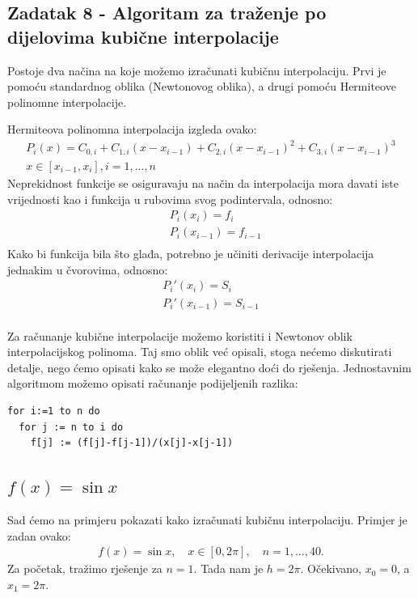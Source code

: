 \documentclass[12pt,a4paper]{report}
\begin{document}
		\subsection{Zadatak 8 - Algoritam za traženje po dijelovima kubične interpolacije}
		Postoje dva načina na koje možemo izračunati kubičnu interpolaciju. Prvi je pomoću standardnog oblika (Newtonovog oblika), a drugi pomoću Hermiteove polinomne interpolacije.
		
		Hermiteova polinomna interpolacija izgleda ovako:
		\begin{align*}
		P_i(x)=C_{0,i}+C_{1,i}(x-x_{i-1})+C_{2,i}(x-x_{i-1})^2+C_{3,i}(x-x_{i-1})^3 \\
		x\in[x_{i-1}, x_i], i=1,...,n
		\end{align*}
		Neprekidnost funkcije se osiguravaju na način da interpolacija mora davati iste vrijednosti kao i funkcija u rubovima svog podintervala, odnosno:
		\begin{align*}
			&P_i(x_i)=f_i\\
			&P_i(x_{i-1})=f_{i-1}\\
		\end{align*}
		Kako bi funkcija bila što glađa, potrebno je učiniti derivacije interpolacija jednakim u čvorovima, odnosno:
		\begin{align*}
		P_i'(x_i)=S_i\\
		P_i'(x_{i-1})=S_{i-1}\\
		\end{align*}
		
		
		Za računanje kubične interpolacije možemo koristiti i Newtonov oblik interpolacijskog polinoma. Taj smo oblik već opisali, stoga nećemo diskutirati detalje, nego ćemo opisati kako se može elegantno doći do rješenja. Jednostavnim algoritmom možemo opisati računanje podijeljenih razlika:
		\begin{lstlisting}
for i:=1 to n do
  for j := n to i do
    f[j] := (f[j]-f[j-1])/(x[j]-x[j-1])
		\end{lstlisting}


		\subsection{$f(x)=\sin x$}
		Sad ćemo na primjeru pokazati kako izračunati kubičnu interpolaciju. Primjer je zadan ovako:
		\begin{align*}
			f(x)=\sin x, \quad x\in [0, 2\pi], \quad n=1,...,40.
		\end{align*}
		Za početak, tražimo rješenje za $n=1$. Tada nam je $h=2\pi$. Očekivano, $x_0 = 0$, a $x_1 = 2\pi$.  
		
\end{document}

